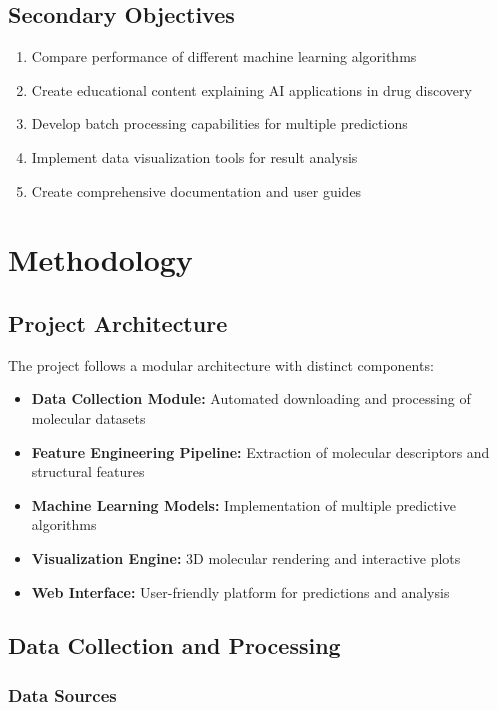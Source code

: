 \documentclass[12pt,a4paper]{article}
\begin{document}
\subsection{Secondary Objectives}
\begin{enumerate}
    \item Compare performance of different machine learning algorithms
    \item Create educational content explaining AI applications in drug discovery
    \item Develop batch processing capabilities for multiple predictions
    \item Implement data visualization tools for result analysis
    \item Create comprehensive documentation and user guides
\end{enumerate}

\section{Methodology}

\subsection{Project Architecture}
The project follows a modular architecture with distinct components:
\begin{itemize}
    \item \textbf{Data Collection Module:} Automated downloading and processing of molecular datasets
    \item \textbf{Feature Engineering Pipeline:} Extraction of molecular descriptors and structural features
    \item \textbf{Machine Learning Models:} Implementation of multiple predictive algorithms
    \item \textbf{Visualization Engine:} 3D molecular rendering and interactive plots
    \item \textbf{Web Interface:} User-friendly platform for predictions and analysis
\end{itemize}

\subsection{Data Collection and Processing}
\subsubsection{Data Sources}
\end{document}
